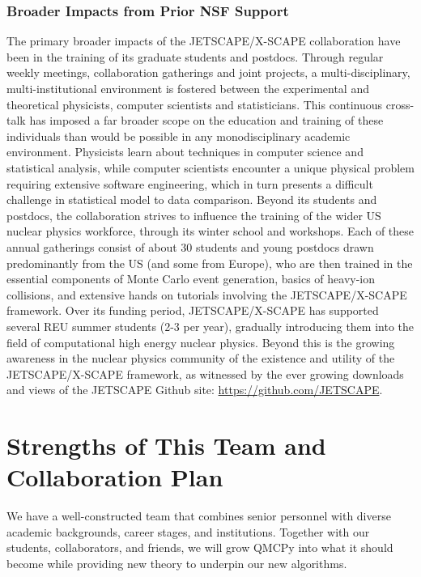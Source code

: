 \documentclass[11pt]{NSFamsart}
\begin{document}
\subsubsection{Broader Impacts from Prior NSF Support}
The primary broader impacts of the JETSCAPE/X-SCAPE collaboration have been in the training of its graduate students and postdocs. Through regular weekly meetings, collaboration gatherings and joint projects, a multi-disciplinary, multi-institutional environment is fostered between the experimental and theoretical physicists, computer scientists and statisticians. This continuous cross-talk has imposed a far broader scope on the education and training of these individuals than would be possible in any monodisciplinary academic environment. Physicists learn about techniques in computer science and statistical analysis, while computer scientists encounter a unique physical problem requiring extensive software engineering, which in turn presents a difficult challenge in statistical model to data comparison. Beyond its students and postdocs, the collaboration strives to influence the training of the wider US nuclear physics workforce, through its winter school and workshops. Each of these annual gatherings consist of about 30 students and young postdocs drawn predominantly from the US (and some from Europe), who are then trained in the essential components of Monte Carlo event generation, basics of heavy-ion collisions, and extensive hands on tutorials involving the JETSCAPE/X-SCAPE framework. Over its funding period, JETSCAPE/X-SCAPE has supported several REU summer students (2-3 per year), gradually introducing them into the field of computational high energy nuclear physics. Beyond this is the growing awareness in the nuclear physics community of the existence and utility of the JETSCAPE/X-SCAPE framework, as witnessed by the ever growing downloads and views of the JETSCAPE Github site: \url{https://github.com/JETSCAPE}.

\section{Strengths of This Team and Collaboration Plan}
We have a well-constructed  team that combines senior personnel with diverse academic backgrounds, career stages, and institutions.  Together with our students, collaborators, and friends, we will grow QMCPy into what it should become while providing new theory to underpin our new algorithms.
\end{document}
